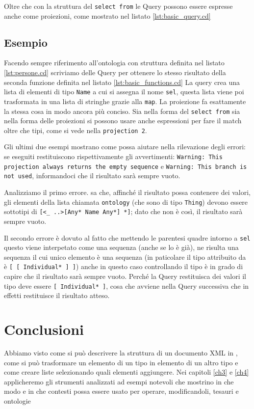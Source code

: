 Oltre che con la struttura del \verb|select from| le Query possono essere espresse anche come proiezioni, come mostrato nel listato \ref{lst:basic_query.cd}

\subsection{Esempio}
Facendo sempre riferimento all'ontologia con struttura definita nel listato \ref{lst:persone.cd} scriviamo delle Query per ottenere lo stesso risultato della seconda funzione definita nel listato \ref{lst:basic_functions.cd}
La query crea una lista di elementi di tipo \verb|Name| a cui si assegna il nome \verb|sel|, questa lista viene poi trasformata in una lista di stringhe grazie alla \verb|map|. La proiezione fa esattamente la stessa cosa in modo ancora più conciso. Sia nella forma del \verb|select from| sia nella forma delle proiezioni si possono usare anche espressioni per fare il match oltre che tipi, come si vede nella \verb|projection 2|.

Gli ultimi due esempi mostrano come \cduce possa aiutare nella rilevazione degli errori: se eseguiti restituiscono rispettivamente gli avvertimenti: \verb|Warning: This projection always returns the empty sequence| e \verb|Warning: This branch is not used|, informandoci che il risultato sarà sempre vuoto.

Analizziamo il primo errore. \cduce sa che, affinché il risultato possa contenere dei valori, gli elementi della lista chiamata \verb|ontology| (che sono di tipo \verb|Thing|) devono essere sottotipi di \verb|[<_ ..>[Any* Name Any*] *]|; dato che non è così, il risultato sarà sempre vuoto.

Il secondo errore è dovuto al fatto che mettendo le parentesi quadre intorno a \verb|sel| questo viene interpetato come una sequenza (anche se lo è già), ne risulta una sequenza il cui unico elemento è una sequenza (in paticolare il tipo attribuito da \cduce è \verb|[ [ Individual* ] ]|) anche in questo caso controllando il tipo \cduce è in grado di capire che il risultato sarà sempre vuoto. Perché la Query restituisca dei valori il tipo deve essere \verb|[ Individual* ]|, cosa che avviene nella Query successiva che in effetti restituisce il risultato atteso.

\section*{Conclusioni}
Abbiamo visto come si può descrivere la struttura di un documento XML in \cduce, come si può trasformare un elemento di un tipo in elemento di un altro tipo e come creare liste selezionando quali elementi aggiungere. Nei capitoli \ref{ch3} e \ref{ch4} applicheremo gli strumenti analizzati ad esempi notevoli che mostrino in che modo e in che contesti \cduce possa essere usato per operare, modificandoli, tesauri e ontologie